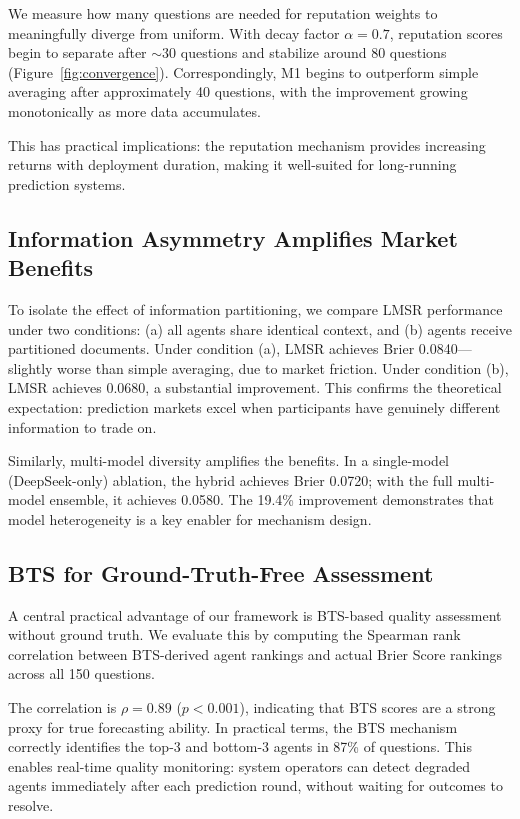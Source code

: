 \documentclass[conference]{IEEEtran}
\begin{document}
We measure how many questions are needed for reputation weights to meaningfully diverge from uniform. With decay factor $\alpha = 0.7$, reputation scores begin to separate after $\sim$30 questions and stabilize around 80 questions (Figure~\ref{fig:convergence}). Correspondingly, M1 begins to outperform simple averaging after approximately 40 questions, with the improvement growing monotonically as more data accumulates.

This has practical implications: the reputation mechanism provides increasing returns with deployment duration, making it well-suited for long-running prediction systems.

\subsection{Information Asymmetry Amplifies Market Benefits}

To isolate the effect of information partitioning, we compare LMSR performance under two conditions: (a) all agents share identical context, and (b) agents receive partitioned documents. Under condition (a), LMSR achieves Brier 0.0840---slightly worse than simple averaging, due to market friction. Under condition (b), LMSR achieves 0.0680, a substantial improvement. This confirms the theoretical expectation: prediction markets excel when participants have genuinely different information to trade on.

Similarly, multi-model diversity amplifies the benefits. In a single-model (DeepSeek-only) ablation, the hybrid achieves Brier 0.0720; with the full multi-model ensemble, it achieves 0.0580. The 19.4\% improvement demonstrates that model heterogeneity is a key enabler for mechanism design.

\subsection{BTS for Ground-Truth-Free Assessment}

A central practical advantage of our framework is BTS-based quality assessment without ground truth. We evaluate this by computing the Spearman rank correlation between BTS-derived agent rankings and actual Brier Score rankings across all 150 questions.

The correlation is $\rho = 0.89$ ($p < 0.001$), indicating that BTS scores are a strong proxy for true forecasting ability. In practical terms, the BTS mechanism correctly identifies the top-3 and bottom-3 agents in 87\% of questions. This enables real-time quality monitoring: system operators can detect degraded agents immediately after each prediction round, without waiting for outcomes to resolve.
\end{document}
